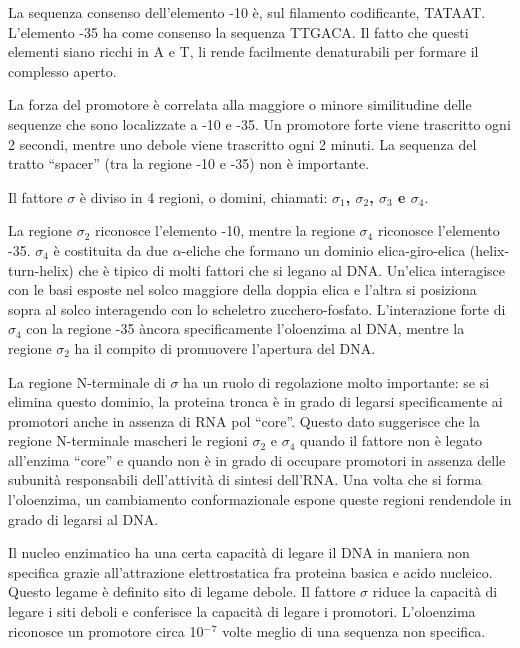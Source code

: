 \documentclass[11pt]{book}
\begin{document}
La sequenza consenso dell'elemento -10 è, sul filamento codificante,
TATAAT. L'elemento -35 ha come consenso la sequenza TTGACA. Il fatto che
questi elementi siano ricchi in A e T, li rende facilmente denaturabili
per formare il complesso aperto.

La forza del promotore è correlata alla maggiore o minore similitudine
delle sequenze che sono localizzate a -10 e -35. Un promotore forte
viene trascritto ogni 2 secondi, mentre uno debole viene trascritto ogni
2 minuti. La sequenza del tratto ``spacer'' (tra la regione -10 e -35)
non è importante.

Il fattore \(\sigma\) è diviso in 4 regioni, o domini, chiamati:
\textbf{\(\sigma\)\(_1\), \(\sigma\)\(_2\), \(\sigma\)\(_3\) e
\(\sigma\)\(_4\)}.

La regione \(\sigma\)\(_2\) riconosce l'elemento -10, mentre la regione
\(\sigma\)\(_4\) riconosce l'elemento -35. \(\sigma\)\(_4\) è costituita
da due \(\alpha\)-eliche che formano un dominio elica-giro-elica
(helix-turn-helix) che è tipico di molti fattori che si legano al DNA.
Un'elica interagisce con le basi esposte nel solco maggiore della doppia
elica e l'altra si posiziona sopra al solco interagendo con lo scheletro
zucchero-fosfato. L'interazione forte di \(\sigma\)\(_4\) con la regione
-35 àncora specificamente l'oloenzima al DNA, mentre la regione
\(\sigma\)\(_2\) ha il compito di promuovere l'apertura del DNA.

La regione N-terminale di \(\sigma\) ha un ruolo di regolazione molto
importante: se si elimina questo dominio, la proteina tronca è in grado
di legarsi specificamente ai promotori anche in assenza di RNA pol
``core''. Questo dato suggerisce che la regione N-terminale mascheri le
regioni \(\sigma\)\(_2\) e \(\sigma\)\(_4\) quando il fattore non è
legato all'enzima ``core'' e quando non è in grado di occupare promotori
in assenza delle subunità responsabili dell'attività di sintesi
dell'RNA. Una volta che si forma l'oloenzima, un cambiamento
conformazionale espone queste regioni rendendole in grado di legarsi al
DNA.

Il nucleo enzimatico ha una certa capacità di legare il DNA in maniera
non specifica grazie all'attrazione elettrostatica fra proteina basica e
acido nucleico. Questo legame è definito sito di legame debole. Il
fattore \(\sigma\) riduce la capacità di legare i siti deboli e
conferisce la capacità di legare i promotori. L'oloenzima riconosce un
promotore circa 10\(^-\)\(^7\) volte meglio di una sequenza non
specifica.
\end{document}
